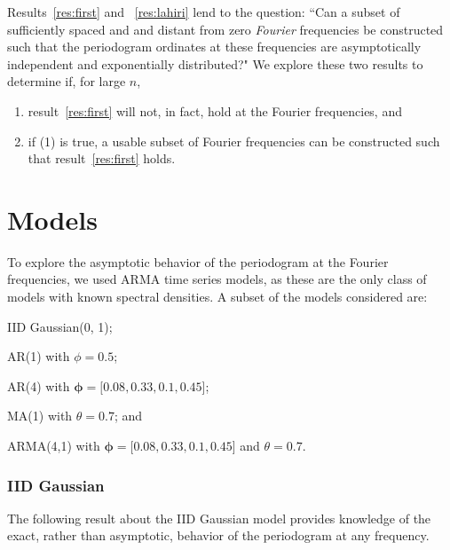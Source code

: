 \documentclass{article}\usepackage{graphicx, color}
\theoremstyle{plain}
\begin{document}
Results~\ref{res:first} and ~\ref{res:lahiri} lend to the question: ``Can a subset of sufficiently spaced and and distant from zero \textit{Fourier} frequencies be constructed such that the periodogram ordinates at these frequencies are asymptotically independent and exponentially distributed?" We explore these two results to determine if, for large $n$,
\begin{enumerate}
  \item result~\ref{res:first} will not, in fact, hold at the Fourier frequencies, and
  \item if (1) is true, a usable subset of Fourier frequencies can be constructed such that result~\ref{res:first} holds.
\end{enumerate}




\section{Models}\label{sec:models}

To explore the asymptotic behavior of the periodogram at the Fourier frequencies, we used ARMA time series models, as these are the only class of models with known spectral densities. A subset of the models considered are: \begin{inparaenum}
\item IID Gaussian(0, 1);
\item AR(1) with $\phi = 0.5$; 
\item AR(4) with $\boldsymbol{\phi} = [0.08, 0.33, 0.1, 0.45$];
\item MA(1) with $\theta = 0.7$; and
\item ARMA(4,1) with $\boldsymbol{\phi} = [0.08, 0.33, 0.1, 0.45$] and $\theta = 0.7$.
\end{inparaenum}

\subsubsection*{IID Gaussian}
The following result about the IID Gaussian model provides knowledge of the exact, rather than asymptotic, behavior of the periodogram at any frequency.
\end{document}
